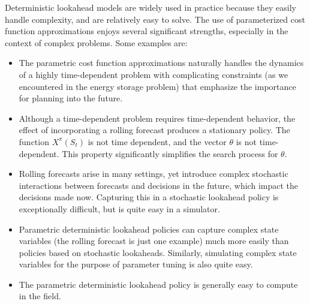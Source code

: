 \documentclass[11pt,oneside,fleqn,reqno,titlepage]{article}
\newcounter{example}
\begin{document}
Deterministic lookahead models are widely used in practice because they easily handle complexity, and are relatively easy to solve.  The use of parameterized cost function approximations enjoys several significant strengths, especially in the context of complex problems.  Some examples are:
\begin{itemize}
\item The parametric cost function approximations naturally handles the dynamics of a highly time-dependent problem with complicating constraints (as we encountered in the energy storage problem) that emphasize the importance for planning into the future.
\item Although a time-dependent problem requires time-dependent behavior, the effect of incorporating a rolling forecast produces a stationary policy.  The function $X^\pi(S_t)$ is not time dependent, and the vector $\theta$ is not time-dependent.  This property significantly simplifies the search process for $\theta$.
\item Rolling forecasts arise in many settings, yet introduce complex stochastic interactions between forecasts and decisions in the future, which impact the decisions made now.  Capturing this in a stochastic lookahead policy is exceptionally difficult, but is quite easy in a simulator.
\item Parametric deterministic lookahead policies can capture complex state variables (the rolling forecast is just one example) much more easily than policies based on stochastic lookaheads.  Similarly, simulating complex state variables for the purpose of parameter tuning is also quite easy.
\item The parametric deterministic lookahead policy is generally easy to compute in the field.
\end{itemize}
\end{document}
